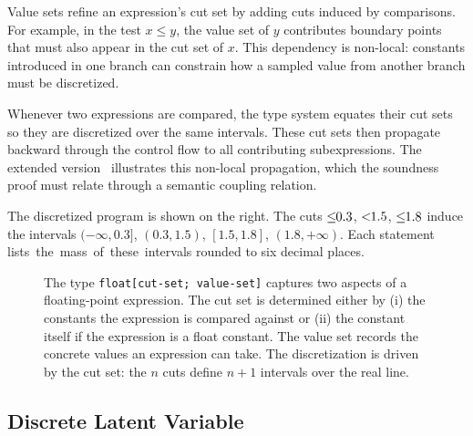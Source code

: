 \noindent Value sets refine an expression's cut set by adding cuts induced by comparisons. For example, in the test $x \leq y$, the value set of $y$ contributes boundary points that must also appear in the cut set of $x$. This dependency is non-local: constants introduced in one branch can constrain how a sampled value from another branch must be discretized.

Whenever two expressions are compared, the type system equates their cut sets so they are discretized over the same intervals. These cut sets then propagate backward through the control flow to all contributing subexpressions. The extended version~\cite[Figure~18]{Wu2026SliceExtended} illustrates this non-local propagation, which the soundness proof must relate through a semantic coupling relation.

The discretized program is shown on the right. The cuts $\leq\!\!{0.3}$, $<\!\!{1.5}$, $\leq\!\!{1.8}$ induce the intervals $(-\infty, 0.3]$, $(0.3, 1.5)$, $[1.5, 1.8]$, $(1.8, +\infty)$. Each \discrete{} statement \mbox{lists the mass of these intervals} rounded to six decimal places.

\begin{figure}
    \caption{The type \lstinline{float[cut-set; value-set]} captures two aspects of a floating-point expression. The cut set is determined either by (i) the constants the expression is compared against or (ii) the constant itself if the expression is a float constant. The value set records the concrete values an expression can take. The discretization is driven by the cut set: the $n$ cuts define $n+1$ intervals over the real line.}
    \label{fig:float-type-def}
\end{figure}

\subsection{Discrete Latent Variable}\label{sec:examples:5}


